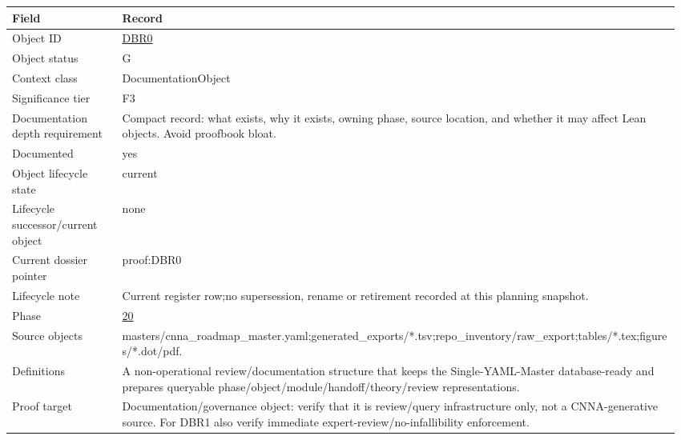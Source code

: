\begin{longtable}{L{0.16\linewidth} L{0.81\linewidth}}
\hline
\textbf{Field} & \textbf{Record}\\
\hline
Object ID & \hyperlink{object-row-DBR0}{DBR0}\\
\hline\addlinespace[0.20em]
Object status & G\\
\hline\addlinespace[0.20em]
Context class & DocumentationObject\\
\hline\addlinespace[0.20em]
Significance tier & F3\\
\hline\addlinespace[0.20em]
Documentation depth requirement & Compact record: what exists, why it exists, owning phase, source location, and whether it may affect Lean objects. Avoid proofbook bloat.\\
\hline\addlinespace[0.20em]
Documented & yes\\
\hline\addlinespace[0.20em]
Object lifecycle state & current\\
\hline\addlinespace[0.20em]
Lifecycle successor/\allowbreak{}current object & none\\
\hline\addlinespace[0.20em]
Current dossier pointer & proof:DBR0\\
\hline\addlinespace[0.20em]
Lifecycle note & Current register row;\newline no supersession, rename or retirement recorded at this planning snapshot.\\
\hline\addlinespace[0.20em]
Phase & \hyperlink{phase-row-20}{20}\\
\hline\addlinespace[0.20em]
Source objects & masters/\allowbreak{}cnna\_roadmap\_master.yaml;\newline generated\_exports/\allowbreak{}*.tsv;\newline repo\_inventory/\allowbreak{}raw\_export;\newline tables/\allowbreak{}*.tex;\newline figures/\allowbreak{}*.dot/\allowbreak{}pdf.\\
\hline\addlinespace[0.20em]
Definitions & A non-operational review/\allowbreak{}documentation structure that keeps the Single-YAML-Master database-ready and prepares queryable phase/\allowbreak{}object/\allowbreak{}module/\allowbreak{}handoff/\allowbreak{}theory/\allowbreak{}review representations.\\
\hline\addlinespace[0.20em]
Proof target & Documentation/\allowbreak{}governance object: verify that it is review/\allowbreak{}query infrastructure only, not a CNNA-generative source. For DBR1 also verify immediate expert-review/\allowbreak{}no-infallibility enforcement.\\

\end{longtable}
